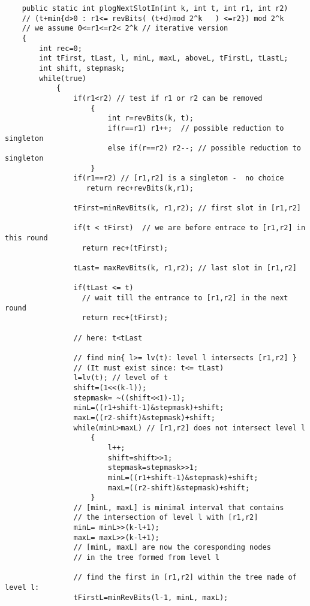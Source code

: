 \documentclass{letter}
\begin{document}
\begin{verbatim}
    public static int plogNextSlotIn(int k, int t, int r1, int r2)
    // (t+min{d>0 : r1<= revBits( (t+d)mod 2^k   ) <=r2}) mod 2^k 
    // we assume 0<=r1<=r2< 2^k // iterative version
    {
        int rec=0;
        int tFirst, tLast, l, minL, maxL, aboveL, tFirstL, tLastL;
        int shift, stepmask;
        while(true)
            {
                if(r1<r2) // test if r1 or r2 can be removed
                    {
                        int r=revBits(k, t);
                        if(r==r1) r1++;  // possible reduction to singleton
                        else if(r==r2) r2--; // possible reduction to singleton
                    }
                if(r1==r2) // [r1,r2] is a singleton -  no choice
                   return rec+revBits(k,r1); 

                tFirst=minRevBits(k, r1,r2); // first slot in [r1,r2]

                if(t < tFirst)  // we are before entrace to [r1,r2] in this round
                  return rec+(tFirst);

                tLast= maxRevBits(k, r1,r2); // last slot in [r1,r2]

                if(tLast <= t) 
                  // wait till the entrance to [r1,r2] in the next round 
                  return rec+(tFirst); 

                // here: t<tLast

                // find min{ l>= lv(t): level l intersects [r1,r2] } 
                // (It must exist since: t<= tLast) 
                l=lv(t); // level of t
                shift=(1<<(k-l));
                stepmask= ~((shift<<1)-1);
                minL=((r1+shift-1)&stepmask)+shift;
                maxL=((r2-shift)&stepmask)+shift;
                while(minL>maxL) // [r1,r2] does not intersect level l
                    {
                        l++;
                        shift=shift>>1;
                        stepmask=stepmask>>1;
                        minL=((r1+shift-1)&stepmask)+shift;
                        maxL=((r2-shift)&stepmask)+shift;
                    }
                // [minL, maxL] is minimal interval that contains 
                // the intersection of level l with [r1,r2] 
                minL= minL>>(k-l+1);
                maxL= maxL>>(k-l+1);
                // [minL, maxL] are now the coresponding nodes 
                // in the tree formed from level l

                // find the first in [r1,r2] within the tree made of level l: 
                tFirstL=minRevBits(l-1, minL, maxL); 
 

\end{verbatim}
\end{document}
